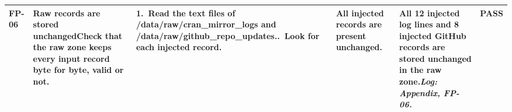 {\begin{longtable}{@{}L{1.1cm}L{5.8cm}L{5.4cm}L{3.9cm}L{5.5cm}L{1.3cm}@{}}
\midrule[0.3pt]
\textbf{FP-06} & \textbf{Raw records are stored unchanged}\newline Check that the raw zone keeps every input record byte for byte, valid or not. & 1.~Read the text files of /\allowbreak{}data/\allowbreak{}raw/\allowbreak{}cran\_\allowbreak{}mirror\_\allowbreak{}logs and /\allowbreak{}data/\allowbreak{}raw/\allowbreak{}github\_\allowbreak{}repo\_\allowbreak{}updates..~Look for each injected record. & All injected records are present unchanged. & All 12 injected log lines and 8 injected GitHub records are stored unchanged in the raw zone.\newline \textit{Log: Appendix, FP-06.} & \textbf{\textcolor{green!45!black}{PASS}} \\
\midrule[0.3pt]
\end{longtable}}
